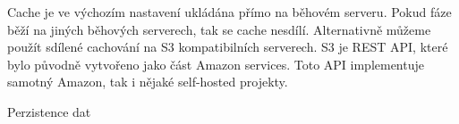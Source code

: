 \noindent
Cache je ve výchozím nastavení ukládána přímo na běhovém serveru.
Pokud fáze běží na jiných běhových serverech, tak se cache nesdílí.
Alternativně můžeme použít sdílené cachování na S3 kompatibilních serverech.
S3 je REST API, které bylo původně vytvořeno jako část Amazon services.
Toto API implementuje samotný Amazon, tak i nějaké self-hosted projekty.


\sec Perzistence dat



